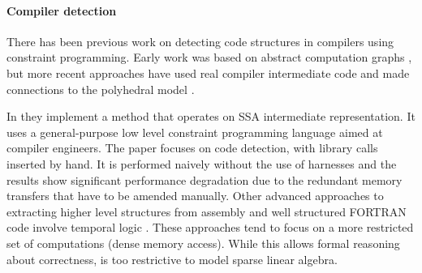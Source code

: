 \paragraph{Compiler detection} There has been previous work on
detecting code structures in compilers using constraint programming.
Early work was based on abstract computation graphs
\cite{pinter1994program}, but more recent approaches have used real
compiler intermediate code and made connections to the polyhedral
model \cite{Ginsbach:2018:CDS:3178372.3179515}.

In \cite{Ginsbach:2018:AML:3173162.3173182} they implement a method that operates on SSA
intermediate representation.
It uses a  general-purpose low level constraint programming language  aimed at
compiler engineers. %
The %
paper focuses  on code detection, with library calls inserted by hand.
It is performed naively without the use of harnesses and the results show
significant performance degradation due to the redundant memory transfers that
have to be amended manually.
Other advanced approaches to extracting higher
level structures from assembly and well structured FORTRAN code
involve temporal logic \cite{Mendis2015Helium, Kamil2016Verified}.
These approaches tend to focus on a more restricted set of
computations (dense memory access).
While this allows formal reasoning about correctness, is too restrictive to
model sparse linear algebra.


